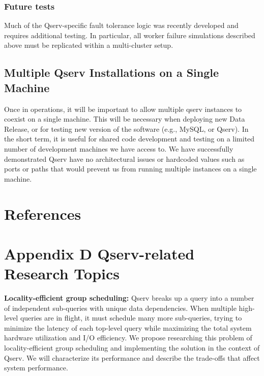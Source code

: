 \documentclass[DM,lsstdraft,toc]{lsstdoc}
\begin{document}
\subsubsection{Future tests}\label{future-tests}

Much of the Qserv-specific fault tolerance logic was recently developed
and requires additional testing. In particular, all worker failure
simulations described above must be replicated within a multi-cluster
setup.

\subsection{Multiple Qserv Installations on a Single
Machine}\label{multiple-qserv-installations-on-a-single-machine}

Once in operations, it will be important to allow multiple qserv
instances to coexist on a single machine. This will be necessary when
deploying new Data Release, or for testing new version of the software
(e.g., MySQL, or Qserv). In the short term, it is useful for shared code
development and testing on a limited number of development machines we
have access to. We have successfully demonstrated Qserv have no
architectural issues or hardcoded values such as ports or paths that
would prevent us from running multiple instances on a single machine.

\section{References}\label{references}
\renewcommand{\refname}{}


\section{Appendix D Qserv-related Research
Topics}\label{appendix-d-qserv-related-research-topics}

\textbf{Locality-efficient group scheduling:} Qserv breaks up a query
into a number of independent sub-queries with unique data dependencies.
When multiple high-level queries are in flight, it must schedule many
more sub-queries, trying to minimize the latency of each top-level query
while maximizing the total system hardware utilization and I/O
efficiency. We propose researching this problem of locality-efficient
group scheduling and implementing the solution in the context of Qserv.
We will characterize its performance and describe the trade-offs that
affect system performance.
\end{document}
